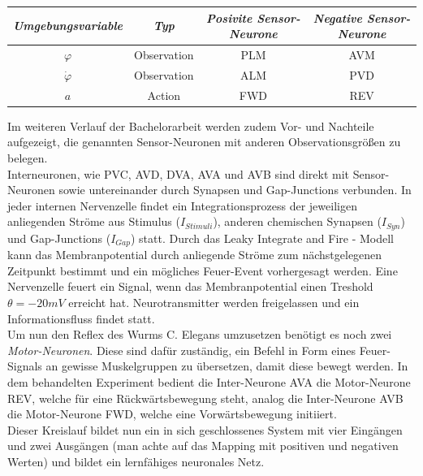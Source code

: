 	\begin{center}
	\begin{tabular}{c@{\hskip 0.5cm}c@{\hskip 0.5cm}c@{\hskip 0.5cm}c}    \toprule
		\setlength{\tabcolsep}{50pt}
		\renewcommand{\arraystretch}{1.5}
		\emph{Umgebungsvariable} & \emph{Typ}  & \emph{Posivite Sensor-Neurone} & \emph{Negative Sensor-Neurone} \\\midrule
		$\varphi$ 				 & Observation & PLM							& AVM							 \\ 
		$\dot{\varphi}$		 	 & Observation & ALM							& PVD							 \\
		$a$						 & Action	   & FWD							& REV							 \\\bottomrule
		\hline
	\end{tabular}
	\end{center}
	Im weiteren Verlauf der Bachelorarbeit werden zudem Vor- und Nachteile aufgezeigt, die genannten Sensor-Neuronen mit anderen Observationsgrößen zu belegen.\\
	Interneuronen, wie PVC, AVD, DVA, AVA und AVB sind direkt mit Sensor-Neuronen sowie untereinander durch Synapsen und Gap-Junctions verbunden. In jeder internen Nervenzelle findet ein Integrationsprozess der jeweiligen anliegenden Ströme aus Stimulus ($I_{Stimuli}$), anderen chemischen Synapsen ($I_{Syn}$) und Gap-Junctions ($I_{Gap}$) statt. Durch das Leaky Integrate and Fire - Modell kann das Membranpotential durch anliegende Ströme zum nächstgelegenen Zeitpunkt bestimmt und ein mögliches Feuer-Event vorhergesagt werden. Eine Nervenzelle feuert ein Signal, wenn das Membranpotential einen Treshold $\theta = -20mV$ erreicht hat. Neurotransmitter werden freigelassen und ein Informationsfluss findet statt.\\
	Um nun den Reflex des Wurms C. Elegans umzusetzen benötigt es noch zwei \textit{Motor-Neuronen}. Diese sind dafür zuständig, ein Befehl in Form eines Feuer-Signals an gewisse Muskelgruppen zu übersetzen, damit diese bewegt werden. In dem behandelten Experiment bedient die Inter-Neurone AVA die Motor-Neurone REV, welche für eine Rückwärtsbewegung steht, analog die Inter-Neurone AVB die Motor-Neurone FWD, welche eine Vorwärtsbewegung initiiert.\\
	Dieser Kreislauf bildet nun ein in sich geschlossenes System mit vier Eingängen und zwei Ausgängen (man achte auf das Mapping mit positiven und negativen Werten) und bildet ein lernfähiges neuronales Netz.
